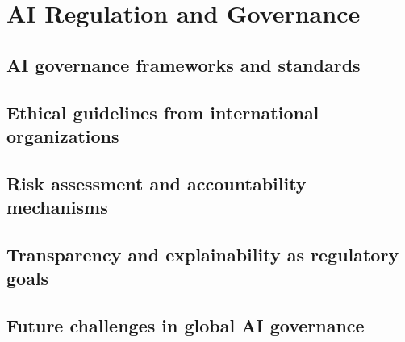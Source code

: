 \section{AI Regulation and Governance}
\subsection{AI governance frameworks and standards}
\subsection{Ethical guidelines from international organizations}
\subsection{Risk assessment and accountability mechanisms}
\subsection{Transparency and explainability as regulatory goals}
\subsection{Future challenges in global AI governance}
